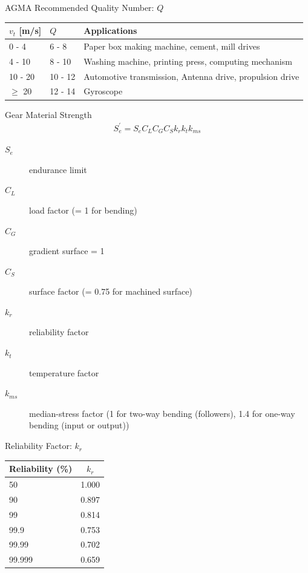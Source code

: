 \documentclass[
10pt,
a4paper,
openany,
svgnames,
]{book}
\begin{document}
\begin{frame}{AGMA Recommended Quality Number: $Q$}
  \begin{table}[htbp]
    \centering
    \begin{tabular}{llp{8cm}}
      \toprule
      $v_{t}$ [m/s] & $Q$ & Applications \\
      \midrule
      0 - 4 & 6 - 8 & Paper box making machine, cement, mill drives \\
      4 - 10 & 8 - 10 & Washing machine, printing press, computing mechanism \\
      10 - 20 & 10 - 12 & Automotive transmission, Antenna drive, propulsion drive \\
      $\geqslant$ 20 & 12 - 14 & Gyroscope
    \end{tabular}
  \end{table}
\end{frame}

\begin{frame}{Gear Material Strength}
  \begin{align*}
    S_{e}^{\prime} = S_{e}C_{L}C_{G}C_{S}k_{r}k_{t}k_{ms}
  \end{align*}
  \begin{description}
    \item[$S_{e}$] endurance limit
    \item[$C_{L}$] load factor (= 1 for bending)
    \item[$C_{G}$] gradient surface = 1
    \item[$C_{S}$] surface factor (= 0.75 for machined surface)
    \item[$k_{r}$] reliability factor
    \item[$k_{t}$] temperature factor
    \item[$k_{ms}$] median-stress factor (1 for two-way bending (followers), 1.4 for one-way bending (input or output))
  \end{description}
\end{frame}

\begin{frame}{Reliability Factor: $k_{r}$}
  \begin{table}[htbp]
    \centering
    \begin{tabular}{lc}
      \toprule
      Reliability (\%) & $k_{r}$ \\
      \midrule
      50 & 1.000 \\
      90 & 0.897 \\
      99 & 0.814 \\
      99.9 & 0.753 \\
      99.99 & 0.702 \\
      99.999 & 0.659 \\
      \bottomrule
    \end{tabular}
  \end{table}
\end{frame}
\end{document}
